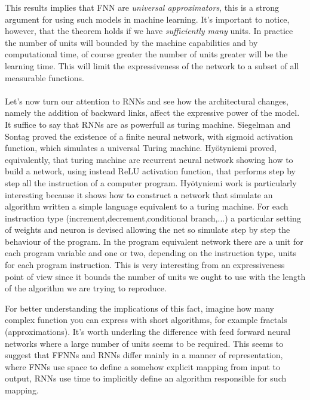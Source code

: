 This results implies that FNN are \textit{universal approximators}, this is a strong argument for using such models in machine learning.
It's important to notice, however, that the theorem holds if we have \textit{sufficiently many} units. In practice the number of units will bounded
by the machine capabilities and by computational time, of course greater the number of units greater will be the learning time. This will limit
the expressiveness of the network to a subset of all measurable functions. 
\\\\Let's now turn our attention to RNNs and see how the architectural changes, namely the addition of backward links, affect the expressive power of the model.
It suffice to say that RNNs are as powerfull as turing machine. Siegelman and Sontag \cite{Siegelmann91turingcomputability} proved the existence 
of a finite neural network, with sigmoid activation function, which simulates a universal Turing machine. Hy{\"o}tyniemi \cite{Hyotyniemi96turingmachines} proved, equivalently,
that turing machine are recurrent neural network showing how to build a network, using instead ReLU activation function, that performs step by step 
all the instruction of a computer program.
Hy{\"o}tyniemi work is particularly interesting because it shows how to construct a network that simulate an algorithm written a simple language equivalent to a turing machine.
For each instruction type (increment,decrement,conditional branch,...) a particular setting of weights and neuron is devised allowing the net so simulate step by step the behaviour of the program. 
In the program equivalent network there are a unit for each program variable and one or two, depending on the instruction type, units for each program instruction.
This is very interesting from an expressiveness point of view since it bounds the number of units we ought to use with the length of the algorithm we are trying to reproduce.

For better understanding the implications of this fact, imagine how many complex function you can express with short algorithms, for example fractals (approximations).
It's worth underling the difference with feed forward neural networks where a large number of units seems to be required. This seems to suggest that FFNNs and RNNs differ mainly in a manner of 
representation, where FNNs use space to define a somehow explicit mapping from input to output, RNNs use time to implicitly define an algorithm responsible for such mapping. 

